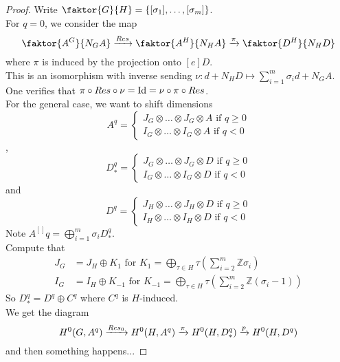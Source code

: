 \documentclass[../main.tex]{subfiles}
\begin{document}
\begin{proof}
Write $ \faktor{G}{H}= \left\{ [ \sigma_1] ,\ldots, [ \sigma_m]  \right\} $.\\
For $q=0$, we consider the map 
\[ 
	\faktor{ A^{G}}{N_G A} \xto{Res} \faktor{A^{H}}{N_H A}\xto{\pi} \faktor{D^{H}}{N_H D}
\]
where $\pi$ is induced by the projection onto $[e] D$.\\
This is an isomorphism with inverse sending $\nu: d+ N_H D \mapsto \sum_{i=1}^{ m}\sigma_i d + N_G A$.\\
One verifies that $\pi \circ Res \circ \nu = \operatorname{Id} = \nu \circ \pi \circ Res$.\\
For the general case, we want to shift dimensions 
\[ 
A^{q}=
\begin{cases}
J_G \otimes\ldots \otimes J_G \otimes A \text{ if } q \geq 0\\
I_G \otimes \ldots \otimes I_G \otimes A \text{ if } q<0
\end{cases}
\]
,
\[ 
D^{q}_\ast = 
\begin{cases}
J_G\otimes\ldots\otimes J_G \otimes D \text{ if } q \geq 0\\
I_G \otimes \ldots \otimes I_G \otimes D \text{ if } q<0
\end{cases}
\]
and
\[ 
D^{q} = 
\begin{cases}
J_H\otimes\ldots\otimes J_H \otimes D \text{ if } q \geq 0\\
I_H \otimes \ldots \otimes I_H \otimes D \text{ if } q<0
\end{cases}
\]
Note $A^[]{q}= \bigoplus_{i=1}^{m}\sigma_i D_\ast^{q}$.\\
Compute that 
\begin{align*}
	J_G & = J_H \oplus K_1 \text{ for } K_1 = \bigoplus_{\tau\in H} \tau\left( \sum_{i=2}^{ m} \mathbb{Z}\sigma_i\right) \\
I_G &= I_H \oplus K_{-1} \text{ for } K_{-1} = \bigoplus_{\tau \in H} \tau\left( \sum_{i=2}^{ m} \mathbb{Z}( \sigma_i -1) \right) 
\end{align*}
So $D_\ast^{q}= D^{q}\oplus C^{q}$ where $C^{q}$ is $H$-induced.\\
We get the diagram
\[ 
	H^{0}( G, A^{q}) \xrightarrow{Res_0} H^{0}( H,A^{q}) \xrightarrow{\pi} H^{0}( H, D_\ast^{q}) \xrightarrow{p} H^{0}( H, D^{q}) 
\]
and then something happens...
\end{proof}
\end{document}
